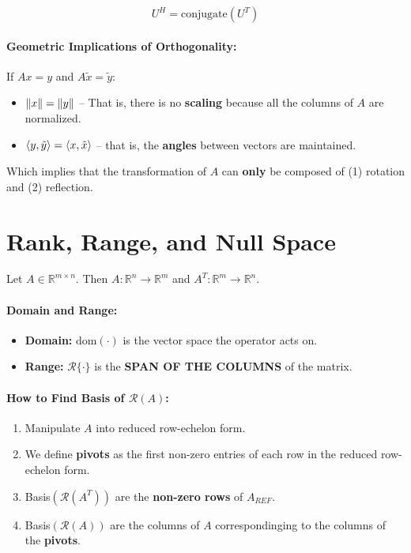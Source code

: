 \documentclass[a4paper,12pt]{report}
\DeclarePairedDelimiter\norm{\lVert}{\rVert}%
\DeclarePairedDelimiter\inpr{\langle}{\rangle}%
\def\reals{\mathbb{R}}
\begin{document}
$$U^H = \text{conjugate}(U^T)$$

\paragraph{Geometric Implications of Orthogonality: } 
If $Ax = y$ and $A\tilde{x} = \tilde{y}$: 
\begin{itemize}
		\item $\norm{x} = \norm{y}$ -- That is, there is no \textbf{scaling} because all the columns of $A$ are normalized.
		\item $\inpr{y, \tilde{y}} = \inpr{x, \tilde{x}}$ -- that is, the \textbf{angles} between vectors are maintained.
\end{itemize}

Which implies that the transformation of $A$ can \textbf{only} be composed of (1) rotation and (2) reflection.

\section{Rank, Range, and Null Space}

Let $A\in \reals^{m\times n}$. Then $A:\reals^n \to \reals^m$ and $A^T: \reals^m \to \reals^n$.

\paragraph{Domain and Range: } 
\begin{itemize}
\item \textbf{Domain: } $\text{dom}(\cdot)$ is the vector space the operator acts on.
\item \textbf{Range: } $\mathcal{R}\{\cdot\}$ is the \textbf{SPAN OF THE COLUMNS} of the matrix.
\end{itemize}

\paragraph{How to Find Basis of $\mathcal{R}(A)$: }
\begin{enumerate}
\item Manipulate $A$ into reduced row-echelon form.
\item We define \textbf{pivots} as the first non-zero entries of each row in the reduced row-echelon form.
\item Basis$(\mathcal{R}(A^T))$ are the \textbf{non-zero rows} of $A_{REF}$.
\item Basis$(\mathcal{R}(A))$ are the columns of $A$ correspondinging to the columns of the \textbf{pivots}.
\end{enumerate}
\end{document}
